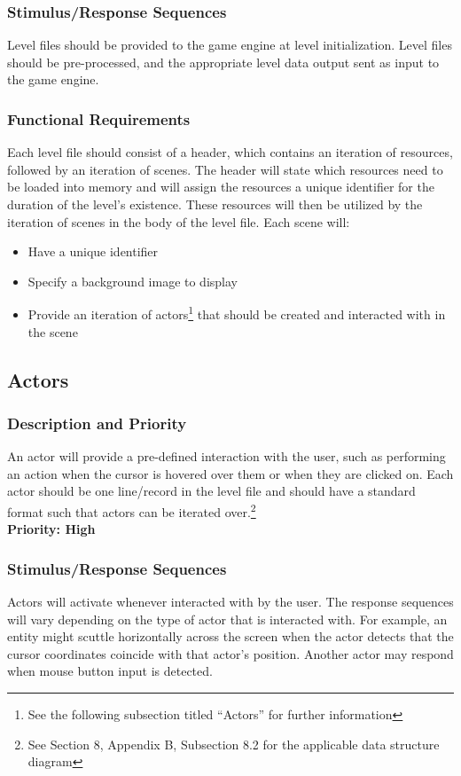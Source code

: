 \documentclass{article}
\begin{document}
		\subsubsection{Stimulus/Response Sequences}
			Level files should be provided to the game engine at level initialization. Level files should be pre-processed, and the appropriate level data output sent as input to the game engine.
		\subsubsection{Functional Requirements}
			Each level file should consist of a header, which contains an iteration of resources, followed by an iteration of scenes. The header will state which resources need to be loaded into memory and will assign the resources a unique identifier for the duration of the level's existence. These resources will then be utilized by the iteration of scenes in the body of the level file.
			 Each scene will:
			 \begin{itemize}
			 	\item Have a unique identifier
				\item Specify a background image to display
				\item Provide an iteration of actors\footnote{See the following subsection titled ``Actors'' for further information} that should be created and interacted with in the scene \bigskip
			\end{itemize}
	\subsection{Actors}
		\subsubsection{Description and Priority}
			An actor will provide a pre-defined interaction with the user, such as performing an action when the cursor is hovered over them or when they are clicked on. Each actor should be one line/record in the level file and should have a standard format such that actors can be iterated over.\footnote{See Section 8, Appendix B, Subsection 8.2 for the applicable data structure diagram} \bigskip \\
			\textbf{Priority: High}
		\subsubsection{Stimulus/Response Sequences}
			Actors will activate whenever interacted with by the user. The response sequences will vary depending on the type of actor that is interacted with. For example, an entity might scuttle horizontally across the screen when the actor detects that the cursor coordinates coincide with that actor's position. Another actor may respond when mouse button input is detected. 
\end{document}
